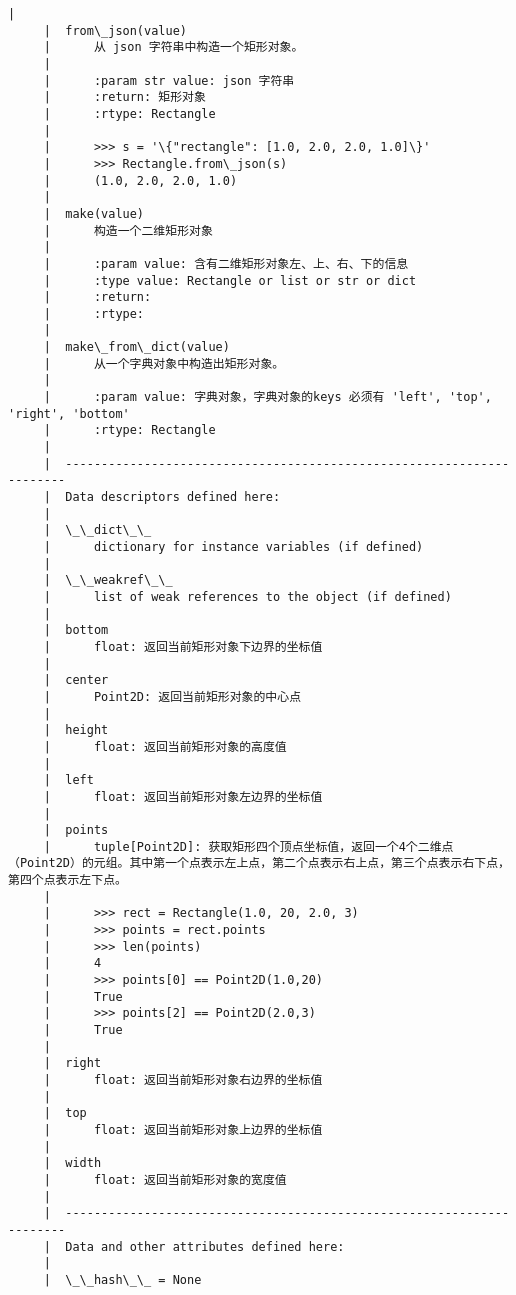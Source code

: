 \documentclass[11pt]{article}
\begin{document}
\begin{Verbatim}[commandchars=\\\{\}]
     |  
     |  from\_json(value)
     |      从 json 字符串中构造一个矩形对象。
     |      
     |      :param str value: json 字符串
     |      :return: 矩形对象
     |      :rtype: Rectangle
     |      
     |      >>> s = '\{"rectangle": [1.0, 2.0, 2.0, 1.0]\}'
     |      >>> Rectangle.from\_json(s)
     |      (1.0, 2.0, 2.0, 1.0)
     |  
     |  make(value)
     |      构造一个二维矩形对象
     |      
     |      :param value: 含有二维矩形对象左、上、右、下的信息
     |      :type value: Rectangle or list or str or dict
     |      :return:
     |      :rtype:
     |  
     |  make\_from\_dict(value)
     |      从一个字典对象中构造出矩形对象。
     |      
     |      :param value: 字典对象，字典对象的keys 必须有 'left', 'top', 'right', 'bottom'
     |      :rtype: Rectangle
     |  
     |  ----------------------------------------------------------------------
     |  Data descriptors defined here:
     |  
     |  \_\_dict\_\_
     |      dictionary for instance variables (if defined)
     |  
     |  \_\_weakref\_\_
     |      list of weak references to the object (if defined)
     |  
     |  bottom
     |      float: 返回当前矩形对象下边界的坐标值
     |  
     |  center
     |      Point2D: 返回当前矩形对象的中心点
     |  
     |  height
     |      float: 返回当前矩形对象的高度值
     |  
     |  left
     |      float: 返回当前矩形对象左边界的坐标值
     |  
     |  points
     |      tuple[Point2D]: 获取矩形四个顶点坐标值，返回一个4个二维点（Point2D）的元组。其中第一个点表示左上点，第二个点表示右上点，第三个点表示右下点，第四个点表示左下点。
     |      
     |      >>> rect = Rectangle(1.0, 20, 2.0, 3)
     |      >>> points = rect.points
     |      >>> len(points)
     |      4
     |      >>> points[0] == Point2D(1.0,20)
     |      True
     |      >>> points[2] == Point2D(2.0,3)
     |      True
     |  
     |  right
     |      float: 返回当前矩形对象右边界的坐标值
     |  
     |  top
     |      float: 返回当前矩形对象上边界的坐标值
     |  
     |  width
     |      float: 返回当前矩形对象的宽度值
     |  
     |  ----------------------------------------------------------------------
     |  Data and other attributes defined here:
     |  
     |  \_\_hash\_\_ = None
    

\end{Verbatim}
\end{document}
